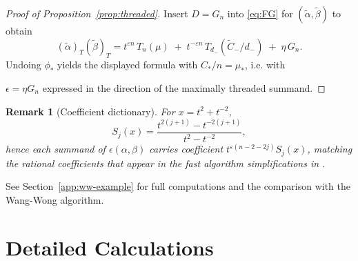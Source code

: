 \documentclass[12pt]{article}
\newtheorem{remark}[theorem]{Remark}
\begin{document}
\begin{proof}[Proof of Proposition~\ref{prop:threaded}]
Insert $D=G_n$ into \eqref{eq:FG} for $(\tilde\alpha,\tilde\beta)$ to obtain
\[
(\tilde\alpha)_T(\tilde\beta)_T
= t^{\varepsilon n}\,T_{n}(\mu) \;+\; t^{-\varepsilon n}\,T_{d_-}(\tilde C_-/d_-)
\;+\; \eta\,G_n.
\]
Undoing $\phi_*$ yields the displayed formula with $C_\ast/n=\mu_\ast$, i.e. with

$\epsilon= \eta G_n$ expressed in the direction of the maximally threaded summand.
\end{proof}

\begin{remark}[Coefficient dictionary]\label{rem:dictionary}
For $x=t^2+t^{-2}$,
\[
S_j(x)=\frac{t^{2(j+1)}-t^{-2(j+1)}}{t^2-t^{-2}},
\]
hence each summand of $\epsilon(\alpha,\beta)$ carries coefficient
$t^{\varepsilon(n-2-2j)}S_j(x)$, matching the rational coefficients that appear in the
fast algorithm simplifications in \cite[\S~4]{wangwong}.
\end{remark}

See Section~\ref{app:ww-example} for full computations and the comparison with the Wang-Wong algorithm.
























































\appendix
\label{appendix}

\section{Detailed Calculations}
\end{document}
